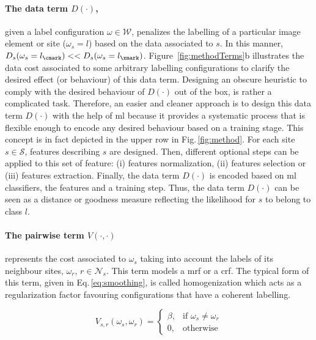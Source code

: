\paragraph{The data term $D(\cdot)$,} \label{sec:method:dataTerm}
given a label configuration $\omega \in \mathcal{W}$, penalizes the labelling of a particular image element or site ($\omega_s = l$) based on the data associated to $s$.
In this manner, $D_s(\omega_s=l_\cmark) << D_s(\omega_s=l_\xmark)$.
Figure~\ref{fig:methodTerms}b illustrates the data cost associated to some arbitrary labelling configurations to clarify the desired effect (or behaviour) of this data term.
Designing an obscure heuristic to comply with the desired behaviour of $D(\cdot)$ out of the box, is rather a complicated task.
Therefore, an easier and cleaner approach is to design this data term $D(\cdot)$ with the help of \ac{ml} because it provides a systematic process that is flexible enough to encode any desired behaviour based on a training stage.
This concept is in fact depicted in the upper row in Fig.\,\ref{fig:method}.
For each site $s \in \mathcal{S}$, features describing $s$ are designed. Then, different optional steps can be applied to this set of feature: (i) features normalization, (ii) features selection or (iii) features extraction. Finally, the data term $D(\cdot)$ is encoded based on \ac{ml} classifiers, the features and a training step.
Thus, the data term $D(\cdot)$ can be seen as a distance or goodness measure reflecting the likelihood for $s$ to belong to class $l$.

\paragraph{The pairwise term $V(\cdot,\cdot)$} \label{sec:method:mrfTerm}
represents the cost associated to $\omega_s$ taking into account the labels of its neighbour sites, $\omega_r$, $r \in \mathcal{N}_{s}$. 
This term models a \ac{mrf} or a \ac{crf}.
The typical form of this term, given in Eq.\,\eqref{eq:smoothing}, is called homogenization which acts as a regularization factor favouring configurations that have a coherent labelling.

\begin{equation}
V_{s,r}(\omega_s,\omega_r) = 
\begin{cases}
    \beta, & \text{if } \omega_s \ne \omega_r\\
    0,              & \text{otherwise}
\end{cases}
\label{eq:smoothing}
\end{equation}

